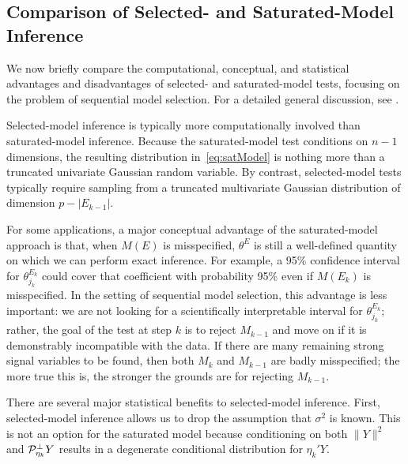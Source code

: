 \documentclass{article}
\begin{document}
\subsection{Comparison of Selected- and Saturated-Model Inference}\label{sec:bivariate}

We now briefly compare the computational, conceptual, and statistical advantages and disadvantages of selected- and saturated-model tests, focusing on the problem of sequential model selection. For a detailed general discussion, see \citet[][Section 5]{fithian2014optimal}.

Selected-model inference is typically more computationally involved than saturated-model inference. Because the saturated-model test conditions on $n-1$ dimensions, the resulting distribution in~\eqref{eq:satModel} is nothing more than a truncated univariate Gaussian random variable. By contrast, selected-model tests typically require sampling from a truncated multivariate Gaussian distribution of dimension $p-|E_{k-1}|$.

For some applications, a major conceptual advantage of the saturated-model approach is that, when $M(E)$ is misspecified, $\theta^{E}$ is still a well-defined quantity on which we can perform exact inference. For example, a 95\% confidence interval for $\theta_{j_k}^{E_k}$ could cover that coefficient with probability 95\% even if $M(E_k)$ is misspecified. In the setting of sequential model selection, this advantage is less important: we are not looking for a scientifically interpretable interval for $\theta_{j_k}^{E_k}$; rather, the goal of the test at step $k$ is to reject $M_{k-1}$ and move on if it is demonstrably incompatible with the data. If there are many remaining strong signal variables to be found, then both $M_k$ and $M_{k-1}$ are badly misspecified; the more true this is, the stronger the grounds are for rejecting $M_{k-1}$.


There are several major statistical benefits to selected-model inference. First, selected-model inference allows us to drop the assumption that $\sigma^2$ is known. This is not an option for the saturated model because conditioning on both $\|Y\|^2$ and $\mathcal{P}_{\eta_k}^\perp Y$ results in a degenerate conditional distribution for $\eta_k'Y$.
\end{document}

